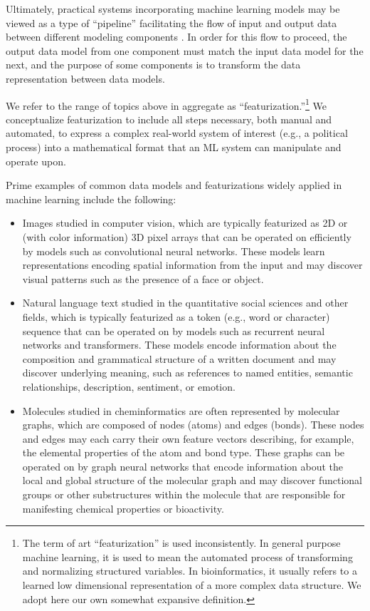 \documentclass[nonacm,12pt]{acmart}
\begin{document}
Ultimately, practical systems incorporating machine learning models may be viewed as a type of ``pipeline'' facilitating the flow of input and output data between different modeling components \cite{xin_production_2021}.  
In order for this flow to proceed, the output data model from one component must match the input data model for the next, and the purpose of some components is to transform the data representation between data models.

We refer to the range of topics above in aggregate as ``featurization.''\footnote{The term of art ``featurization'' is used inconsistently. In general purpose machine learning, it is used to mean the automated process of transforming and normalizing structured variables. In bioinformatics,  it usually refers to a learned low dimensional representation of a more complex data structure. We adopt here our own somewhat expansive definition.}  We conceptualize featurization to include all steps necessary, both manual and automated, to express a complex real-world system of interest (e.g., a political process) into a mathematical format that an ML system can manipulate and operate upon.  

Prime examples of common data models and featurizations widely applied in machine learning include the following:

\begin{itemize}
    \item Images studied in computer vision, which are typically featurized as 2D or (with color information) 3D pixel arrays that can be operated on efficiently by models such as convolutional neural networks. 
    These models learn representations encoding spatial information from the input and may discover visual patterns such as the presence of a face or object.
    \item Natural language text studied in the quantitative social sciences and other fields, which is typically featurized as a token (e.g., word or character) sequence that can be operated on by models such as recurrent neural networks and transformers. 
    These models encode information about the composition and grammatical structure of a written document and may discover underlying meaning, such as references to named entities, semantic relationships, description, sentiment, or emotion.
    \item Molecules studied in cheminformatics are often represented by molecular graphs, which are composed of nodes (atoms) and edges (bonds). 
    These nodes and edges may each carry their own feature vectors describing, for example, the elemental properties of the atom and bond type. 
    These graphs can be operated on by graph neural networks that encode information about the local and global structure of the molecular graph and may discover functional groups or other substructures within the molecule that are responsible for manifesting chemical properties or bioactivity.
\end{itemize}
\end{document}
